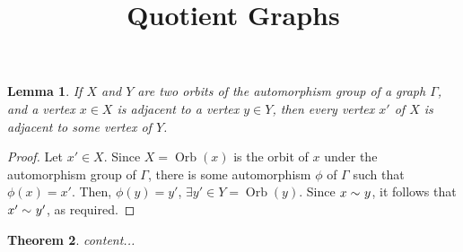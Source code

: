 \documentclass[12pt,a4paper]{amsart}
\title{Quotient Graphs}
\date{}
\newtheorem{Theorem}{Theorem}[section]
\newtheorem{Lemma}[Theorem]{Lemma}
\theoremstyle{remark}
\theoremstyle{definition}
\newcommand{\adj}[1]{\sim_{\scriptscriptstyle #1}}
\DeclareMathOperator{\orb}{Orb}
\begin{document}
\maketitle
\begin{Lemma}
\label{lem:xy=>x'y'}
If $X$ and $Y$ are two orbits of the automorphism group of a graph $\Gamma$, and a vertex $x \in X$ is adjacent to a vertex $y \in Y$, then every vertex $x'$ of $X$ is adjacent to some vertex of $Y$.
\end{Lemma}

\begin{proof}
Let $x' \in X$. Since $X = \orb(x)$ is the orbit of $x$ under the automorphism group of $\Gamma$, there is some automorphism $\phi$ of $\Gamma$ such that $\phi(x) = x'$. Then, $\phi(y) = y'$, $\exists y' \in Y = \orb(y)$. Since $x \adj{} y$, it follows that $x' \adj{} y'$, as required.
\end{proof}

\begin{Theorem}
content...
\end{Theorem}
\end{document}
